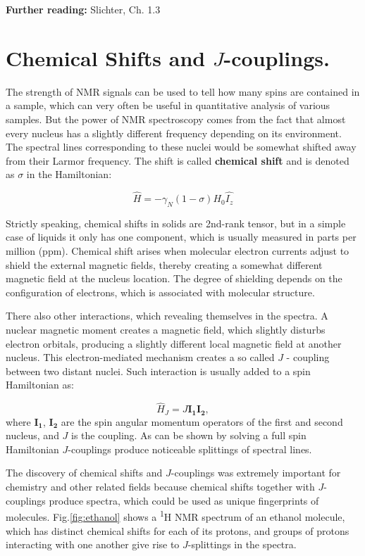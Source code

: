 \documentclass[a4paper, 12pt]{article}
\begin{document}
\textbf{Further reading:} Slichter, Ch. 1.3 

\section{Chemical Shifts and $J$-couplings.}
 The strength of NMR signals can be used to tell how many spins are contained in a sample, which can very often be useful in quantitative analysis of various samples. But the power of NMR spectroscopy comes from the fact that almost every nucleus has a slightly different frequency depending on its environment. The spectral lines corresponding to these nuclei would be somewhat shifted away from their Larmor frequency. The shift is called \textbf{chemical shift} and is denoted as $\sigma$ in the Hamiltonian:

\begin{equation}
\hat{H} = -\gamma_N (1 - \sigma) H_0 \hat{I_z}
\end{equation}

Strictly speaking, chemical shifts in solids are 2nd-rank tensor, but in a simple case of liquids it only has one component, which is usually measured in parts per million (ppm). Chemical shift arises when molecular electron currents adjust to shield the external magnetic fields, thereby creating a somewhat different magnetic field at the nucleus location. The degree of shielding depends on the configuration of electrons, which is associated with molecular structure.

 There also other interactions, which revealing themselves in the spectra. A nuclear magnetic moment creates a magnetic field, which slightly disturbs electron orbitals, producing a slightly different local magnetic field at another nucleus. This electron-mediated mechanism creates a so called $J$ - coupling between two distant nuclei. Such interaction is usually added to a spin Hamiltonian as:

\begin{equation}
\hat{H}_J = J \bm{I_1} \bm{I_2},
\end{equation}
where $\bm{I_1}$, $\bm{I_2}$ are the spin angular momentum operators of the first and second nucleus, and $J$ is the coupling. As can be shown by solving a full spin Hamiltonian $J$-couplings produce noticeable splittings of spectral lines.

  The discovery of chemical shifts and $J$-couplings was extremely important for chemistry and other related fields because chemical shifts together with $J$-couplings produce spectra, which could be used as unique fingerprints of molecules. Fig.\ref{fig:ethanol} shows a \textsuperscript{1}H NMR spectrum of an ethanol molecule, which has distinct chemical shifts for each of its protons, and groups of protons interacting with one another give rise to $J$-splittings in the spectra. 
  
\end{document}
